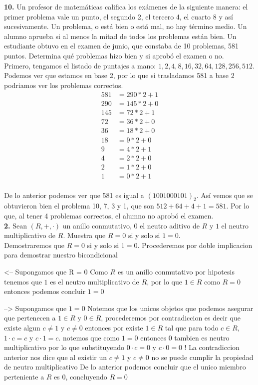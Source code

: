 \documentclass[12pt]{article}
\begin{document}
\vspace{1cm}

%
%
\textbf{10.} Un profesor de matemáticas califica los exámenes de la siguiente manera: el primer problema vale un
punto, el segundo 2, el tercero 4, el cuarto 8 y así sucesivamente. Un problema, o está bien o está mal, no hay
término medio. Un alumno aprueba si al menos la mitad de todos los problemas están bien. Un estudiante
obtuvo en el examen de junio, que constaba de 10 problemas, 581 puntos. Determina qué problemas hizo bien
y si aprobó el examen o no.\\

Primero, tengamos el listado de puntajes a mano: $1, 2, 4, 8, 16, 32, 64, 128, 256, 512$.\\

Podemos ver que estamos en base 2, por lo que si trasladamos 581 a base 2 podriamos ver los problemas correctos.
\begin{align*}
    581 &= 290 \ast 2 + 1\\
    290 &= 145 \ast 2 + 0\\
    145 &= 72 \ast 2 + 1\\
    72 &= 36 \ast 2 + 0\\
    36 &= 18 \ast 2 + 0\\
    18 &= 9 \ast 2 + 0\\
    9 &= 4 \ast 2 + 1\\
    4 &= 2 \ast 2 + 0\\
    2 &= 1 \ast 2 + 0\\
    1 &= 0 \ast 2 + 1\\
\end{align*}

De lo anterior podemos ver que 581 es igual a $(1001000101)_2$. Así vemos que se obtuvieron bien el problema 10, 7, 3 y 1, que son 
$512 + 64 + 4 + 1 = 581$. Por lo que, al tener 4 problemas correctos, el alumno no aprobó el examen.\\
\vspace{1cm}
%
%
\textbf{2.} Sean $(R, +, ·)$ un anillo conmutativo, $0$ el neutro aditivo de $R$ y $1$ el neutro multiplicativo de $R$. Muestra
que $R = {0}$ si y solo si $1 = 0$. \\

Demostraremos que $R = {0}$ si y solo si $1 = 0$.
Procederemos por doble implicacion para demostrar nuestro bicondicional

<--
Supongamos que R = {0}
Como $R$ es un anillo conmutativo por hipotesis tenemos que $1$ es el neutro multiplicativo de $R$, por lo que $1 \in R$ como $R = {0}$ entonces podemos concluir
$1 = 0$

-->
Supongamos que $1 = 0$
Notemos que los unicos objetos que podemos asegurar que pertenecen a $1 \in R$ y $0 \in R$, procederemos por contradiccion es decir que existe algun $c \neq 1$ y $c \neq 0$ entonces
por existe $1 \in R$ tal que para todo $c \in R$, $1 · c = c$ y $c · 1 = c$.
notemos que como $1 = 0$ entonces $0$ tambien es neutro multiplicativo por lo que substituyendo
$0 · c = 0$ y $c · 0 = 0$ !
La contradiccion anterior nos dice que al existir un $c \neq 1$ y $c \neq 0$ no se puede cumplir la propiedad de neutro multiplicativo
De lo anterior podemos concluir que el unico miembro perteniente a $R$ es $0$, concluyendo $R = {0}$
\end{document}
